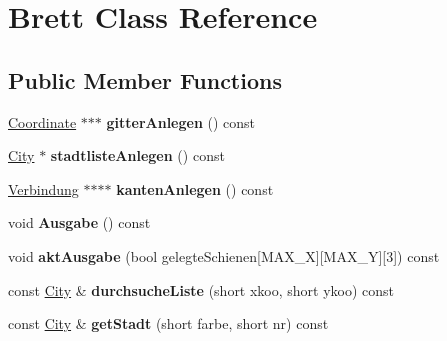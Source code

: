 \hypertarget{class_brett}{\section{Brett Class Reference}
\label{class_brett}
}
\subsection*{Public Member Functions}
\begin{DoxyCompactItemize}
\item 
\hypertarget{class_brett_a72bbf86800d1f477b9e4625d325e465a}{\hyperlink{class_coordinate}{Coordinate} $\ast$$\ast$$\ast$ {\bfseries gitter\-Anlegen} () const }\label{class_brett_a72bbf86800d1f477b9e4625d325e465a}

\item 
\hypertarget{class_brett_ad97a233596be0bf7708d4eab4247cba6}{\hyperlink{class_city}{City} $\ast$ {\bfseries stadtliste\-Anlegen} () const }\label{class_brett_ad97a233596be0bf7708d4eab4247cba6}

\item 
\hypertarget{class_brett_ae6144255642555208de19a5c967ab145}{\hyperlink{class_verbindung}{Verbindung} $\ast$$\ast$$\ast$$\ast$ {\bfseries kanten\-Anlegen} () const }\label{class_brett_ae6144255642555208de19a5c967ab145}

\item 
\hypertarget{class_brett_af4526c6857f25f88a38e58f025d4baa1}{void {\bfseries Ausgabe} () const }\label{class_brett_af4526c6857f25f88a38e58f025d4baa1}

\item 
\hypertarget{class_brett_ac3511a492cf4f2fab2318fb0e05bd886}{void {\bfseries akt\-Ausgabe} (bool gelegte\-Schienen\mbox{[}M\-A\-X\-\_\-\-X\mbox{]}\mbox{[}M\-A\-X\-\_\-\-Y\mbox{]}\mbox{[}3\mbox{]}) const }\label{class_brett_ac3511a492cf4f2fab2318fb0e05bd886}

\item 
\hypertarget{class_brett_ad17aa1d5ba5df7590889d952dfe6417c}{const \hyperlink{class_city}{City} \& {\bfseries durchsuche\-Liste} (short xkoo, short ykoo) const }\label{class_brett_ad17aa1d5ba5df7590889d952dfe6417c}

\item 
\hypertarget{class_brett_a13c7a8d7d6c0f445727f8531251c14fc}{const \hyperlink{class_city}{City} \& {\bfseries get\-Stadt} (short farbe, short nr) const }\label{class_brett_a13c7a8d7d6c0f445727f8531251c14fc}

\end{DoxyCompactItemize}
